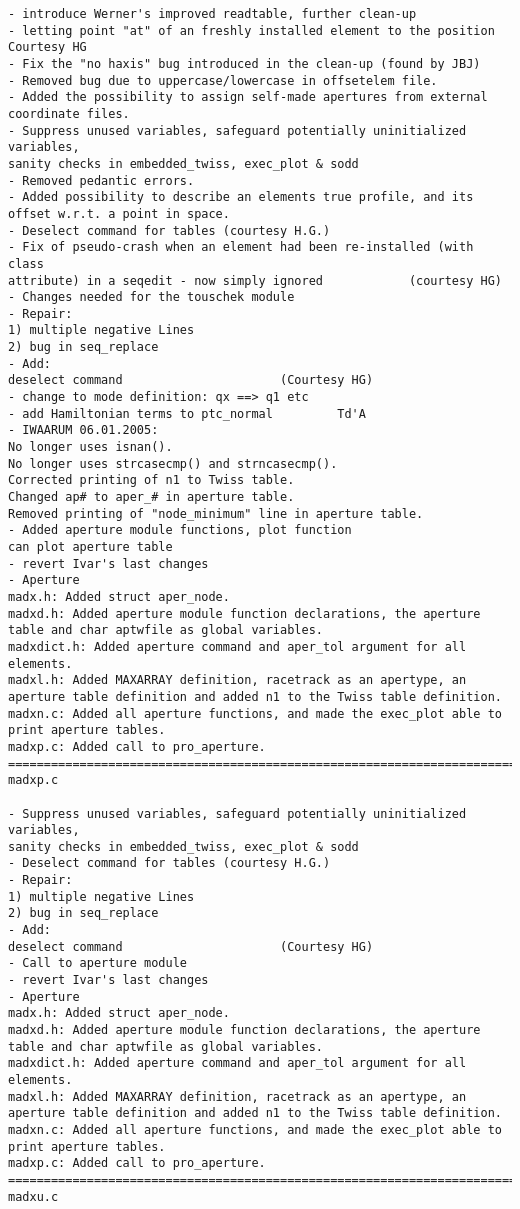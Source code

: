 \begin{verbatim}
- introduce Werner's improved readtable, further clean-up
- letting point "at" of an freshly installed element to the position
Courtesy HG
- Fix the "no haxis" bug introduced in the clean-up (found by JBJ)
- Removed bug due to uppercase/lowercase in offsetelem file.
- Added the possibility to assign self-made apertures from external
coordinate files.
- Suppress unused variables, safeguard potentially uninitialized variables,
sanity checks in embedded_twiss, exec_plot & sodd
- Removed pedantic errors.
- Added possibility to describe an elements true profile, and its
offset w.r.t. a point in space.
- Deselect command for tables (courtesy H.G.)
- Fix of pseudo-crash when an element had been re-installed (with class
attribute) in a seqedit - now simply ignored            (courtesy HG)
- Changes needed for the touschek module
- Repair:
1) multiple negative Lines
2) bug in seq_replace
- Add:
deselect command                      (Courtesy HG)
- change to mode definition: qx ==> q1 etc
- add Hamiltonian terms to ptc_normal         Td'A
- IWAARUM 06.01.2005:
No longer uses isnan().
No longer uses strcasecmp() and strncasecmp().
Corrected printing of n1 to Twiss table.
Changed ap# to aper_# in aperture table.
Removed printing of "node_minimum" line in aperture table.
- Added aperture module functions, plot function
can plot aperture table
- revert Ivar's last changes
- Aperture
madx.h: Added struct aper_node.
madxd.h: Added aperture module function declarations, the aperture
table and char aptwfile as global variables.
madxdict.h: Added aperture command and aper_tol argument for all elements.
madxl.h: Added MAXARRAY definition, racetrack as an apertype, an
aperture table definition and added n1 to the Twiss table definition.
madxn.c: Added all aperture functions, and made the exec_plot able to
print aperture tables.
madxp.c: Added call to pro_aperture.
=============================================================================
madxp.c

- Suppress unused variables, safeguard potentially uninitialized variables,
sanity checks in embedded_twiss, exec_plot & sodd
- Deselect command for tables (courtesy H.G.)
- Repair:
1) multiple negative Lines
2) bug in seq_replace
- Add:
deselect command                      (Courtesy HG)
- Call to aperture module
- revert Ivar's last changes
- Aperture
madx.h: Added struct aper_node.
madxd.h: Added aperture module function declarations, the aperture
table and char aptwfile as global variables.
madxdict.h: Added aperture command and aper_tol argument for all elements.
madxl.h: Added MAXARRAY definition, racetrack as an apertype, an
aperture table definition and added n1 to the Twiss table definition.
madxn.c: Added all aperture functions, and made the exec_plot able to
print aperture tables.
madxp.c: Added call to pro_aperture.
=============================================================================
madxu.c


\end{verbatim}
